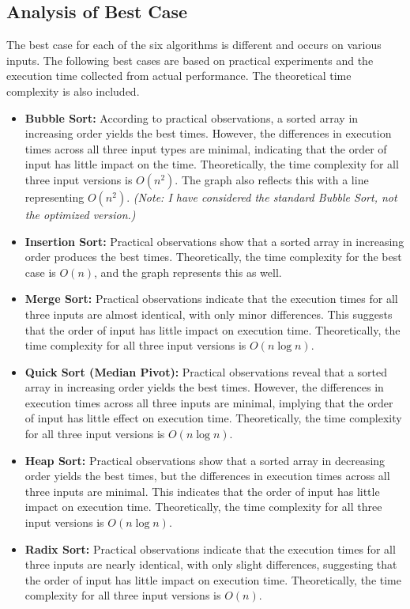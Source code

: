 \documentclass[a4paper,12pt]{report}
\begin{document}
\subsection{Analysis of Best Case}
The best case for each of the six algorithms is different and occurs on various inputs. The following best cases are based on practical experiments and the execution time collected from actual performance. The theoretical time complexity is also included.
\begin{itemize}
    \item \textbf{Bubble Sort:} According to practical observations, a sorted array in increasing order yields the best times. However, the differences in execution times across all three input types are minimal, indicating that the order of input has little impact on the time. Theoretically, the time complexity for all three input versions is \(O(n^2)\). The graph also reflects this with a line representing \(O(n^2)\). \emph{(Note: I have considered the standard Bubble Sort, not the optimized version.)}
    
    \item \textbf{Insertion Sort:} Practical observations show that a sorted array in increasing order produces the best times. Theoretically, the time complexity for the best case is \(O(n)\), and the graph represents this as well.
    
    \item \textbf{Merge Sort:} Practical observations indicate that the execution times for all three inputs are almost identical, with only minor differences. This suggests that the order of input has little impact on execution time. Theoretically, the time complexity for all three input versions is \(O(n \log n)\).
    
    \item \textbf{Quick Sort (Median Pivot):} Practical observations reveal that a sorted array in increasing order yields the best times. However, the differences in execution times across all three inputs are minimal, implying that the order of input has little effect on execution time. Theoretically, the time complexity for all three input versions is \(O(n \log n)\).
    
    \item \textbf{Heap Sort:} Practical observations show that a sorted array in decreasing order yields the best times, but the differences in execution times across all three inputs are minimal. This indicates that the order of input has little impact on execution time. Theoretically, the time complexity for all three input versions is \(O(n \log n)\).
    
    \item \textbf{Radix Sort:} Practical observations indicate that the execution times for all three inputs are nearly identical, with only slight differences, suggesting that the order of input has little impact on execution time. Theoretically, the time complexity for all three input versions is \(O(n)\).
\end{itemize}
\end{document}
